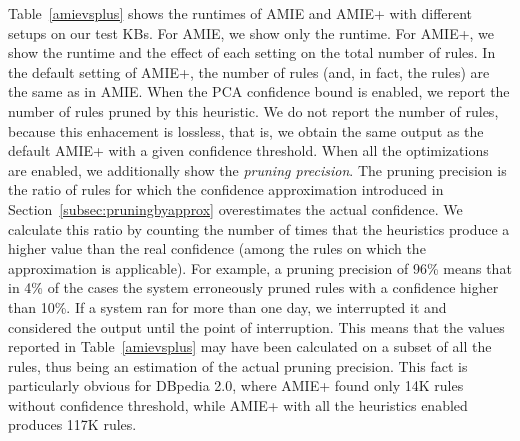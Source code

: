 Table~\ref{amievsplus} shows the runtimes of AMIE and AMIE+ with different setups on our test KBs.
For AMIE, we show only the runtime.
For AMIE+, we show the runtime and the effect of each setting on the total number of rules.
In the default setting of AMIE+, the number of rules (and, in fact, the rules) are the same as in AMIE.
When the PCA confidence bound is enabled, we report
the number of rules pruned by this heuristic. We do not report the number of rules,
because this enhacement is lossless, that is, we obtain the same output as the default AMIE+ with a given confidence threshold.
When all the optimizations are enabled, we additionally show the \emph{pruning precision}.
The pruning precision is the ratio of rules for which the confidence approximation introduced
in Section~\ref{subsec:pruningbyapprox} overestimates the actual confidence. We
calculate this ratio by counting the number of times that the heuristics
produce a higher value than the real confidence (among the rules on which the approximation is applicable). For example, a pruning precision of 96\% means
that in 4\% of the cases the system erroneously pruned rules with a confidence higher than 10\%.
If a system ran for more than one day, we interrupted it
and considered the output until the point of interruption.
This means that the values reported in Table~\ref{amievsplus}
may have been calculated on a
subset of all the rules, thus being an estimation of the actual pruning precision.
This fact is particularly obvious
for DBpedia 2.0, where AMIE+ found only 14K rules without confidence threshold,
while AMIE+ with all the heuristics enabled produces 117K rules.

